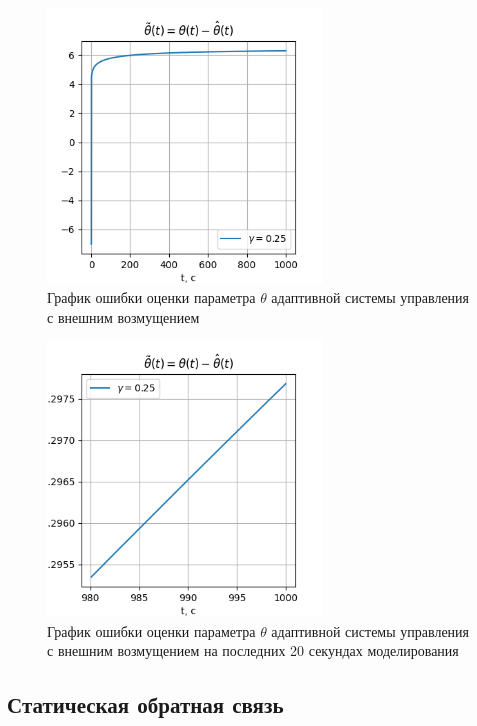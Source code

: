 \documentclass{article}
\begin{document}
\begin{figure}[h!]
  \centering
  \includegraphics[width=0.65\textwidth]{figs/1_big_theta_e.png}
  \caption{График ошибки оценки параметра $\theta$ адаптивной системы управления с внешним возмущением} 
  \label{fig:task1_y}
\end{figure}

\begin{figure}[h!]
  \centering
  \includegraphics[width=0.65\textwidth]{figs/1_small_theta_e.png}
  \caption{График ошибки оценки параметра $\theta$ адаптивной системы управления с внешним возмущением на последних 20 секундах моделирования} 
  \label{fig:task1_y}
\end{figure}
\FloatBarrier
\subsection{Статическая обратная связь}
\end{document}

